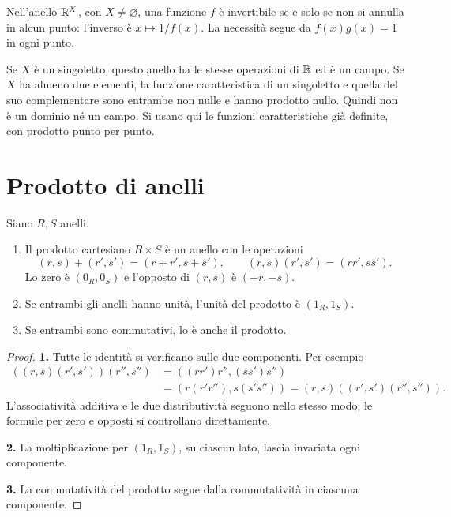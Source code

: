 \begin{esempio}
Nell'anello $\mathbb{R}^X$, con $X\ne\varnothing$, una funzione $f$ è invertibile se e solo se non si annulla in alcun punto: l'inverso è $x\mapsto1/f(x)$. La necessità segue da $f(x)g(x)=1$ in ogni punto.

Se $X$ è un singoletto, questo anello ha le stesse operazioni di $\mathbb{R}$ ed è un campo. Se $X$ ha almeno due elementi, la funzione caratteristica di un singoletto e quella del suo complementare sono entrambe non nulle e hanno prodotto nullo. Quindi non è un dominio né un campo. Si usano qui le funzioni caratteristiche già definite, con prodotto punto per punto.
\end{esempio}

\section{Prodotto di anelli}
\begin{proposizione}
Siano $R,S$ anelli.
\begin{enumerate}[label=\arabic*.]
\item Il prodotto cartesiano $R\times S$ è un anello con le operazioni
\[
(r,s)+(r',s')=(r+r',s+s'),\qquad
(r,s)(r',s')=(rr',ss').
\]
Lo zero è $(0_R,0_S)$ e l'opposto di $(r,s)$ è $(-r,-s)$.
\item Se entrambi gli anelli hanno unità, l'unità del prodotto è $(1_R,1_S)$.
\item Se entrambi sono commutativi, lo è anche il prodotto.
\end{enumerate}
\end{proposizione}
\begin{proof}
\textbf{1.} Tutte le identità si verificano sulle due componenti. Per esempio
\[
\begin{aligned}
((r,s)(r',s'))(r'',s'')
 &=((rr')r'',(ss')s'')\\
 &=(r(r'r''),s(s's''))=(r,s)((r',s')(r'',s'')).
\end{aligned}
\]
L'associatività additiva e le due distributività seguono nello stesso modo; le formule per zero e opposti si controllano direttamente.

\textbf{2.} La moltiplicazione per $(1_R,1_S)$, su ciascun lato, lascia invariata ogni componente.

\textbf{3.} La commutatività del prodotto segue dalla commutatività in ciascuna componente.
\end{proof}

